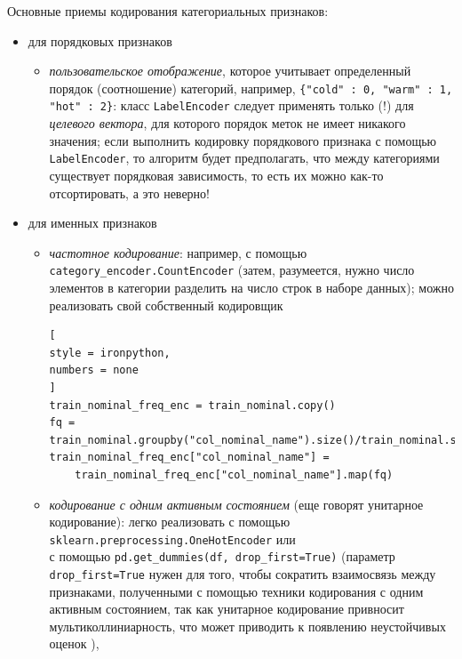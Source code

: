 \documentclass[%
	11pt,
	a4paper,
	utf8,
		]{article}
\begin{document}
Основные приемы кодирования категориальных признаков:
\begin{itemize}
	\item для порядковых признаков
	\begin{itemize}
		\item \emph{пользовательское отображение}, которое учитывает определенный порядок (соотношение) категорий, например, \verb|{"cold" : 0, "warm" : 1, "hot" : 2}|: класс \texttt{LabelEncoder} следует применять только (!) для \emph{целевого вектора}, для которого порядок меток не имеет никакого значения; если выполнить кодировку порядкового признака с помощью \texttt{LabelEncoder}, то алгоритм будет предполагать, что между категориями существует порядковая зависимость, то есть их можно как-то отсортировать, а это неверно! \cite[151]{raschka:2019}
	\end{itemize}

    \item для именных признаков
    \begin{itemize}
    	\item \emph{частотное кодирование}: например, с помощью \texttt{category\_encoder.CountEncoder} (затем, разумеется, нужно число элементов в категории разделить на число строк в наборе данных); можно реализовать свой собственный кодировщик 
\begin{lstlisting}[
style = ironpython,
numbers = none
]
train_nominal_freq_enc = train_nominal.copy()
fq = train_nominal.groupby("col_nominal_name").size()/train_nominal.shape[0]
train_nominal_freq_enc["col_nominal_name"] =
    train_nominal_freq_enc["col_nominal_name"].map(fq)
\end{lstlisting}

    \item \emph{кодирование с одним активным состоянием} (еще говорят унитарное кодирование): легко реализовать с помощью \\ \texttt{sklearn.preprocessing.OneHotEncoder} или \\ с помощью \texttt{pd.get\_dummies(df, drop\_first=True)} (параметр \texttt{drop\_first=True} нужен для того, чтобы сократить взаимосвязь между признаками, полученными с помощью техники кодирования с одним активным состоянием, так как унитарное кодирование привносит мультиколлиниарность, что может приводить к появлению неустойчивых оценок \cite[153]{raschka:2019}),
    

\end{itemize}
\end{itemize}
\end{document}
